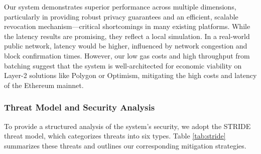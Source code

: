\documentclass[lettersize,journal]{IEEEtran}
\begin{document}
\begin{itemize}
Our system demonstrates superior performance across multiple dimensions, particularly in providing robust privacy guarantees and an efficient, scalable revocation mechanism—critical shortcomings in many existing platforms. While the latency results are promising, they reflect a local simulation. In a real-world public network, latency would be higher, influenced by network congestion and block confirmation times. However, our low gas costs and high throughput from batching suggest that the system is well-architected for economic viability on Layer-2 solutions like Polygon or Optimism, mitigating the high costs and latency of the Ethereum mainnet.
\subsubsection{Threat Model and Security Analysis}
To provide a structured analysis of the system's security, we adopt the STRIDE threat model, which categorizes threats into six types. Table \ref{tab:stride} summarizes these threats and outlines our corresponding mitigation strategies.


\end{itemize}
\end{document}
